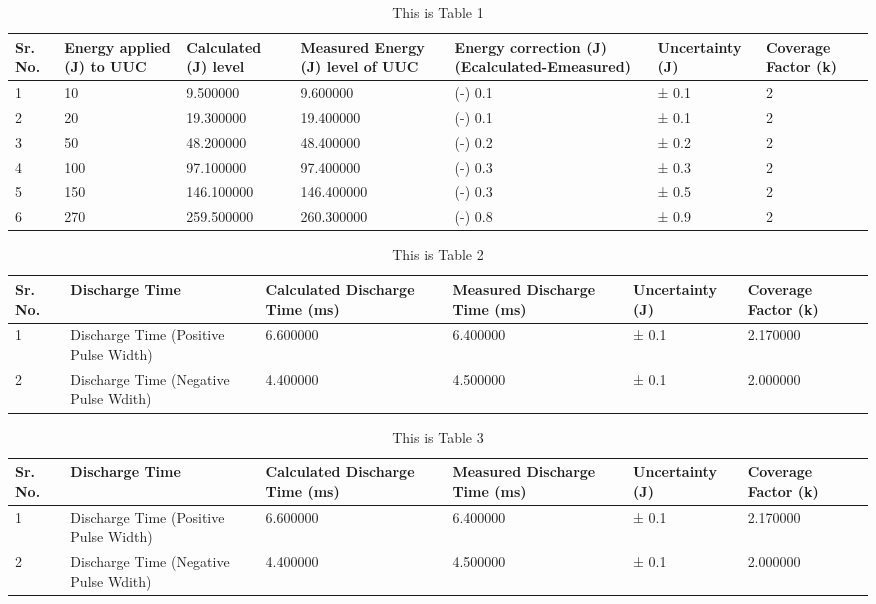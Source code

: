 \begin{table}
\caption{This is Table 1}
\begin{tabular}{|p{2.00 cm}|p{2.00 cm}|p{2.00 cm}|p{2.00 cm}|p{2.00 cm}|p{2.00 cm}|p{2.00 cm}|}
\toprule
Sr. No. & Energy applied (J) to UUC & Calculated (J) level & Measured Energy (J) level of UUC & Energy correction (J) (Ecalculated-Emeasured) & Uncertainty (J) & Coverage Factor (k) \\ \hline
\midrule
1 & 10 & 9.500000 & 9.600000 & (-) 0.1 & ± 0.1 & 2 \\ \hline
2 & 20 & 19.300000 & 19.400000 & (-) 0.1 & ± 0.1 & 2 \\ \hline
3 & 50 & 48.200000 & 48.400000 & (-) 0.2 & ± 0.2 & 2 \\ \hline
4 & 100 & 97.100000 & 97.400000 & (-) 0.3 & ± 0.3 & 2 \\ \hline
5 & 150 & 146.100000 & 146.400000 & (-) 0.3 & ± 0.5 & 2 \\ \hline
6 & 270 & 259.500000 & 260.300000 & (-) 0.8 & ± 0.9 & 2 \\ \hline
\bottomrule
\end{tabular}
\end{table}
\begin{table}
\caption{This is Table 2}
\begin{tabular}{|p{2.33 cm}|p{2.33 cm}|p{2.33 cm}|p{2.33 cm}|p{2.33 cm}|p{2.33 cm}|}
\toprule
Sr. No. & Discharge Time & Calculated Discharge Time (ms) & Measured Discharge Time (ms) & Uncertainty (J) & Coverage Factor (k) \\ \hline
\midrule
1 & Discharge Time (Positive Pulse Width) & 6.600000 & 6.400000 & ± 0.1 & 2.170000 \\ \hline
2 & Discharge Time (Negative Pulse Wdith) & 4.400000 & 4.500000 & ± 0.1 & 2.000000 \\ \hline
\bottomrule
\end{tabular}
\end{table}
\begin{table}
\caption{This is Table 3}
\begin{tabular}{|p{2.33 cm}|p{2.33 cm}|p{2.33 cm}|p{2.33 cm}|p{2.33 cm}|p{2.33 cm}|}
\toprule
Sr. No. & Discharge Time & Calculated Discharge Time (ms) & Measured Discharge Time (ms) & Uncertainty (J) & Coverage Factor (k) \\ \hline
\midrule
1 & Discharge Time (Positive Pulse Width) & 6.600000 & 6.400000 & ± 0.1 & 2.170000 \\ \hline
2 & Discharge Time (Negative Pulse Wdith) & 4.400000 & 4.500000 & ± 0.1 & 2.000000 \\ \hline
\bottomrule
\end{tabular}
\end{table}
